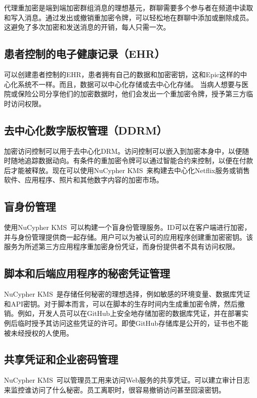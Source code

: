 \documentclass[longbibliography,nofootinbib]{revtex4-1}
\newcommand{\kms}{NuCypher KMS}
\begin{document}
    代理重加密是端到端加密群组消息的理想基元，群聊需要多个参与者在频道中读取和写入消息。通过发出或撤销重加密令牌，可以轻松地在群聊中添加或删除成员。 这避免了多次加密和发送消息的开销，每人只需一次。

\subsection{患者控制的电子健康记录（EHR）}

    可以创建患者控制的EHR，患者拥有自己的数据和加密密钥，这和Epic这样的中心化系统不一样。而且，数据可以中心化存储或去中心化存储。 当病人想要与医院或保险公司分享他们的加密数据时，他们会发出一个重加密令牌，授予第三方临时访问权限。

\subsection{去中心化数字版权管理（DDRM）}
\label{sec:drm}

        加密访问控制可以用于去中心化DRM。访问控制可以嵌入到加密本身中，以便随时随地追踪数据动向。有条件的重加密令牌可以通过智能合约来控制，以便在付款后才能被释放。现在可以使用\kms~来构建去中心化Netflix服务或销售软件、应用程序、照片和其他数字内容的加密市场。

\subsection{盲身份管理}

    使用\kms~可以构建一个盲身份管理服务。ID可以在客户端进行加密，并与身份管理提供商一起存储。用户可以为被认可的应用程序创建重加密密钥。该服务为所述第三方应用程序重加密身份凭证，而身份提供者不具有访问权限。

\subsection{脚本和后端应用程序的秘密凭证管理}

        \kms~是存储任何秘密的理想选择，例如敏感的环境变量、数据库凭证和API密钥。对于脚本而言，可以在脚本的生存时间内生成重加密令牌，然后撤销。例如，开发人员可以在GitHub上安全地存储加密的数据库凭证，并在部署实例后临时授予其访问这些凭证的许可。即使GitHub存储库是公开的，证书也不能被未经授权的人使用。

\subsection{共享凭证和企业密码管理}
        \kms~可以管理员工用来访问Web服务的共享凭证。可以建立审计日志来监控谁访问了什么秘密。员工离职时，很容易撤销访问甚至回滚密钥。
\end{document}

